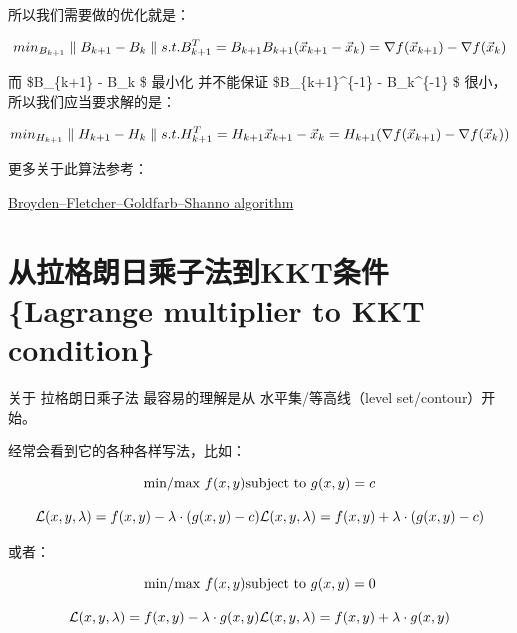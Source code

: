 \documentclass[
]{book}
\begin{document}
所以我们需要做的优化就是：

\[
min_{B_{k+1}} \parallel B_{k+1} - B_k \parallel \\
s.t. B_{k+1}^T = B_{k+1} \\
B_{k+1} ( \vec{x}_{k+1} - \vec{x}_k)  =  \nabla f(\vec{x}_{k+1}) - \nabla f(\vec{x}_{k}) 
\]

而 \$\parallel B\_\{k+1\} - B\_k \parallel  \$ 最小化 并不能保证 \$\parallel B\_\{k+1\}\^{}\{-1\} - B\_k\^{}\{-1\} \parallel \$ 很小，所以我们应当要求解的是：

\[
min_{H_{k+1}} \parallel H_{k+1} - H_k \parallel \\
s.t. H_{k+1}^T = H_{k+1} \\
\vec{x}_{k+1} - \vec{x}_k  =  H_{k+1} ( \nabla f(\vec{x}_{k+1}) - \nabla f(\vec{x}_{k}) ) 
\]

更多关于此算法参考：

\href{https://en.wikipedia.org/wiki/Broyden–Fletcher–Goldfarb–Shanno_algorithm}{Broyden--Fletcher--Goldfarb--Shanno algorithm}

\hypertarget{ux4eceux62c9ux683cux6717ux65e5ux4e58ux5b50ux6cd5ux5230kktux6761ux4ef6-lagrange-multiplier-to-kkt-condition}{%
\chapter{从拉格朗日乘子法到KKT条件 \{Lagrange multiplier to KKT condition\}}\label{ux4eceux62c9ux683cux6717ux65e5ux4e58ux5b50ux6cd5ux5230kktux6761ux4ef6-lagrange-multiplier-to-kkt-condition}}

关于 拉格朗日乘子法 最容易的理解是从 水平集/等高线（level set/contour）开始。

经常会看到它的各种各样写法，比如：

\[
\text{min/max }f(x,y) \\
\text{subject to } g(x,y) = c\\
\]

\[
\mathcal {L}(x,y,\lambda )=f(x,y) - \lambda \cdot ( g(x,y) - c )\\
\mathcal {L}(x,y,\lambda )=f(x,y) + \lambda \cdot ( g(x,y) - c )\\
\]

或者：

\[
\text{min/max } f(x,y) \\
\text{subject to } g(x,y) = 0 \\
\]

\[
\mathcal {L}(x,y,\lambda )=f(x,y) - \lambda \cdot g(x,y) \\
\mathcal {L}(x,y,\lambda )=f(x,y) + \lambda \cdot g(x,y)\\
\]
\end{document}
